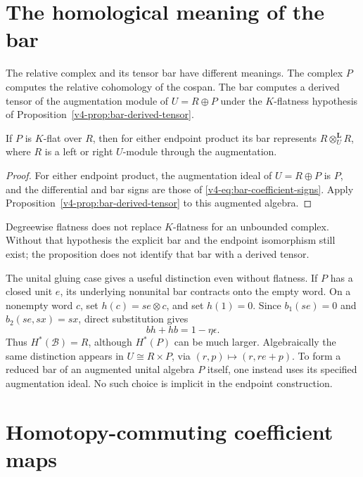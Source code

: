 \section{The homological meaning of the bar}
\label{v4-arith:gluing:sec:derived}

The relative complex and its tensor bar have different meanings.
The complex \(P\) computes the relative cohomology of the cospan. The
bar computes a derived tensor of the augmentation module of
\(U=R\oplus P\) under the \(K\)-flatness hypothesis of
Proposition~\ref{v4-prop:bar-derived-tensor}.

\begin{proposition}\label{v4-arith:gluing:prop:derived}
If \(P\) is \(K\)-flat over \(R\), then for either endpoint product
its bar represents \(R\otimes_U^{\mathbf L}R\), where \(R\) is a
left or right \(U\)-module through the augmentation.
\end{proposition}

\begin{proof}
For either endpoint product, the augmentation ideal of
\(U=R\oplus P\) is \(P\), and the differential and bar signs are
those of \eqref{v4-eq:bar-coefficient-signs}. Apply
Proposition~\ref{v4-prop:bar-derived-tensor} to this augmented algebra.
\end{proof}

Degreewise flatness does not replace \(K\)-flatness for an unbounded
complex. Without that hypothesis the explicit bar and the endpoint
isomorphism still exist; the proposition does not identify that bar
with a derived tensor.

The unital gluing case gives a useful distinction even without
flatness. If \(P\) has a closed unit \(e\), its underlying nonunital
bar contracts onto the empty word. On a nonempty word \(c\), set
\(h(c)=se\otimes c\), and set \(h(1)=0\). Since
\(b_1(se)=0\) and \(b_2(se,sx)=sx\), direct substitution gives
\[
 bh+hb=1-\eta\epsilon.
\]
Thus \(H^*(\mathcal B)=R\), although \(H^*(P)\) can be much larger.
Algebraically the same distinction appears in
\(U\cong R\times P\), via \((r,p)\mapsto(r,re+p)\).
To form a reduced bar of an augmented unital algebra \(P\) itself,
one instead uses its specified augmentation ideal. No such choice is
implicit in the endpoint construction.

\section{Homotopy-commuting coefficient maps}
\label{v4-arith:gluing:sec:maps}

